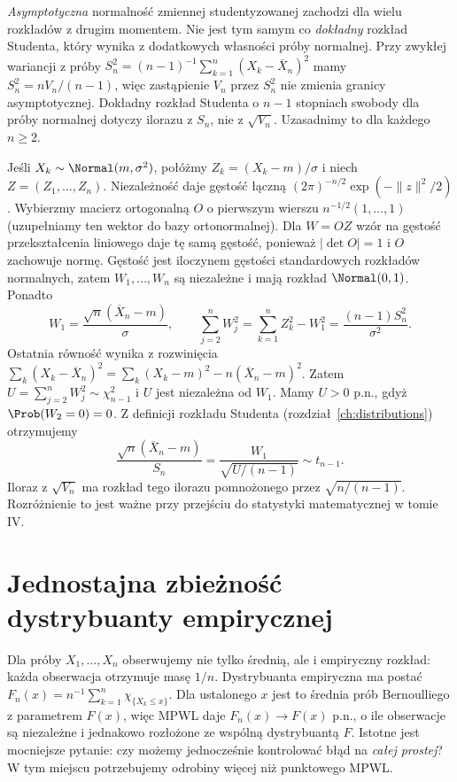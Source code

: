 \begin{uwaga}
\emph{Asymptotyczna} normalność zmiennej
studentyzowanej zachodzi dla wielu rozkładów
z drugim momentem. Nie jest tym samym co
\emph{dokładny} rozkład Studenta, który
wynika z dodatkowych własności próby normalnej.
Przy zwykłej wariancji z próby
$S_n^2=(n-1)^{-1}\sum_{k=1}^n(X_k-\overline X_n)^2$
mamy $S_n^2=nV_n/(n-1)$, więc zastąpienie $V_n$
przez $S_n^2$ nie zmienia granicy asymptotycznej.
Dokładny rozkład Studenta o $n-1$ stopniach swobody
dla próby normalnej dotyczy ilorazu z $S_n$, nie
z $\sqrt{V_n}$. Uzasadnimy to dla każdego $n\geq2$.

Jeśli $X_k\sim\Normal(m,\sigma^2)$, połóżmy
$Z_k=(X_k-m)/\sigma$ i niech $Z=(Z_1,\ldots,Z_n)$.
Niezależność daje gęstość łączną
$(2\pi)^{-n/2}\exp(-\|z\|^2/2)$.
Wybierzmy macierz ortogonalną $O$ o pierwszym wierszu
$n^{-1/2}(1,\ldots,1)$ (uzupełniamy ten wektor do bazy
ortonormalnej). Dla $W=OZ$ wzór na gęstość
przekształcenia liniowego daje tę samą gęstość,
ponieważ $|\det O|=1$ i $O$ zachowuje normę.
Gęstość jest iloczynem gęstości standardowych
rozkładów normalnych, zatem $W_1,\ldots,W_n$ są
niezależne i mają rozkład $\Normal(0,1)$.
Ponadto
\[
W_1=\frac{\sqrt n(\overline X_n-m)}{\sigma},
\qquad
\sum_{j=2}^n W_j^2
=\sum_{k=1}^n Z_k^2-W_1^2
=\frac{(n-1)S_n^2}{\sigma^2}.
\]
Ostatnia równość wynika z rozwinięcia
$\sum_k(X_k-\overline X_n)^2
=\sum_k(X_k-m)^2-n(\overline X_n-m)^2$.
Zatem $U=\sum_{j=2}^n W_j^2\sim\chi^2_{n-1}$
i $U$ jest niezależna od $W_1$. Mamy $U>0$ p.n.,
gdyż $\Prob(W_2=0)=0$. Z definicji rozkładu Studenta
(rozdział~\ref{ch:distributions}) otrzymujemy
\[
\frac{\sqrt n(\overline X_n-m)}{S_n}
=\frac{W_1}{\sqrt{U/(n-1)}}\sim t_{n-1}.
\]
Iloraz z $\sqrt{V_n}$ ma rozkład tego ilorazu
pomnożonego przez $\sqrt{n/(n-1)}$.
Rozróżnienie to jest ważne przy przejściu do
statystyki matematycznej w tomie IV.
\end{uwaga}

\section{Jednostajna zbieżność dystrybuanty empirycznej}

Dla próby $X_1,\ldots,X_n$ obserwujemy nie tylko
średnią, ale i empiryczny rozkład: każda obserwacja
otrzymuje masę $1/n$. Dystrybuanta empiryczna ma
postać
$F_n(x)=n^{-1}\sum_{k=1}^n\chi_{\{X_k\leq x\}}$.
Dla ustalonego $x$ jest to średnia prób Bernoulliego
z parametrem $F(x)$, więc MPWL daje
$F_n(x)\to F(x)$ p.n., o ile obserwacje są niezależne
i jednakowo rozłożone ze wspólną dystrybuantą $F$.
Istotne jest mocniejsze pytanie:
czy możemy jednocześnie kontrolować błąd
na \emph{całej prostej}? W tym miejscu potrzebujemy
odrobiny więcej niż punktowego MPWL.

